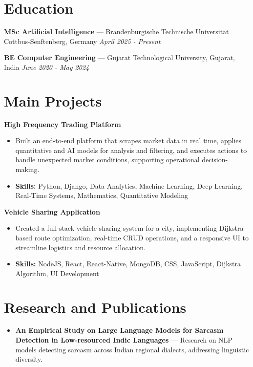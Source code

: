 \documentclass[a4paper,10pt]{article}
\begin{document}
\section*{Education}
\textbf{MSc Artificial Intelligence} — Brandenburgische Technische Universität Cottbus-Senftenberg, Germany \hfill \textit{April 2025 - Present}\par
\vspace{1.5pt}
\textbf{BE Computer Engineering} — Gujarat Technological University, Gujarat, India \hfill \textit{June 2020 - May 2024}\par

\section*{Main Projects}
\textbf{High Frequency Trading Platform}\par
\vspace{1pt}
\begin{itemize}
  \item Built an end-to-end platform that scrapes market data in real time, applies quantitative and AI models for analysis and filtering, and executes actions to handle unexpected market conditions, supporting operational decision-making.
  \item \textbf{Skills:} Python, Django, Data Analytics, Machine Learning, Deep Learning, Real-Time Systems, Mathematics, Quantitative Modeling
\end{itemize}
\vspace{3pt}
\textbf{Vehicle Sharing Application}\par
\vspace{1pt}
\begin{itemize}
  \item Created a full-stack vehicle sharing system for a city, implementing Dijkstra-based route optimization, real-time CRUD operations, and a responsive UI to streamline logistics and resource allocation.
  \item \textbf{Skills:} NodeJS, React, React-Native, MongoDB, CSS, JavaScript, Dijkstra Algorithm, UI Development
\end{itemize}

\section*{Research and Publications}
\begin{itemize}
\item \textbf{An Empirical Study on Large Language Models for Sarcasm Detection in Low-resourced Indic Languages} — Research on NLP models detecting sarcasm across Indian regional dialects, addressing linguistic diversity.
\end{itemize}
\end{document}
